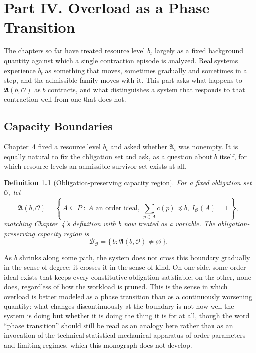 \documentclass[11pt]{report}
\newtheorem{definition}{Definition}[chapter]
\begin{document}
\part*{Part IV. Overload as a Phase Transition}

The chapters so far have treated resource level $b_t$ largely as a fixed background quantity against which a single contraction episode is analyzed. Real systems experience $b_t$ as something that moves, sometimes gradually and sometimes in a step, and the admissible family moves with it. This part asks what happens to $\mathfrak A(b, \mathcal O)$ as $b$ contracts, and what distinguishes a system that responds to that contraction well from one that does not.

\chapter{Capacity Boundaries}

Chapter~4 fixed a resource level $b_t$ and asked whether $\mathfrak A_t$ was nonempty. It is equally natural to fix the obligation set and ask, as a question about $b$ itself, for which resource levels an admissible survivor set exists at all.

\begin{definition}[Obligation-preserving capacity region]
For a fixed obligation set $\mathcal O$, let
\[
\mathfrak A(b, \mathcal O) = \left\{\, A \subseteq P \;:\; A \text{ an order ideal},\ \sum_{p \in A} c(p) \preceq b,\ I_{\mathcal O}(A) = 1 \,\right\},
\]
matching Chapter~4's definition with $b$ now treated as a variable. The obligation-preserving capacity region is
\[
\mathcal B_{\mathcal O} = \{\, b : \mathfrak A(b, \mathcal O) \ne \varnothing \,\}.
\]
\end{definition}

As $b$ shrinks along some path, the system does not cross this boundary gradually in the sense of degree; it crosses it in the sense of kind. On one side, some order ideal exists that keeps every constitutive obligation satisfiable; on the other, none does, regardless of how the workload is pruned. This is the sense in which overload is better modeled as a phase transition than as a continuously worsening quantity: what changes discontinuously at the boundary is not how well the system is doing but whether it is doing the thing it is for at all, though the word ``phase transition'' should still be read as an analogy here rather than as an invocation of the technical statistical-mechanical apparatus of order parameters and limiting regimes, which this monograph does not develop.
\end{document}
